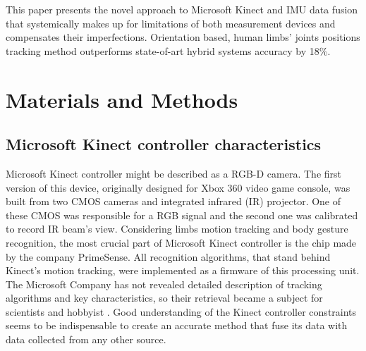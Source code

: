 \documentclass[sensors,article,submit,moreauthors,pdftex,10pt,a4paper]{mdpi}
\begin{document}
This paper presents the novel approach to Microsoft Kinect and IMU data fusion that systemically makes up for limitations of both measurement devices and compensates their imperfections. Orientation based, human limbs’ joints positions tracking method outperforms state-of-art hybrid systems accuracy by 18\%.

\section{Materials and Methods}



\subsection{Microsoft Kinect controller characteristics}
Microsoft Kinect controller might be described as a RGB-D camera. The first version of this device, originally designed for Xbox 360 video game console, was built from two CMOS cameras and integrated infrared (IR) projector. One of these CMOS was responsible for a RGB signal and the second one was calibrated to record IR beam’s view. Considering limbs motion tracking and body gesture recognition, the most crucial part of Microsoft Kinect controller is the chip made by the company PrimeSense. All recognition algorithms, that stand behind Kinect’s motion tracking, were implemented as a firmware of this processing unit. 
The Microsoft Company has not revealed detailed description of tracking algorithms and key characteristics, so their retrieval became a subject for scientists and hobbyist \cite{Skalski2015,Gonzalez-Jorge2013,Khoshelham2012}. Good understanding of the Kinect controller constraints seems to be indispensable to create an accurate method that fuse its data with data collected from any other source. 
\end{document}
